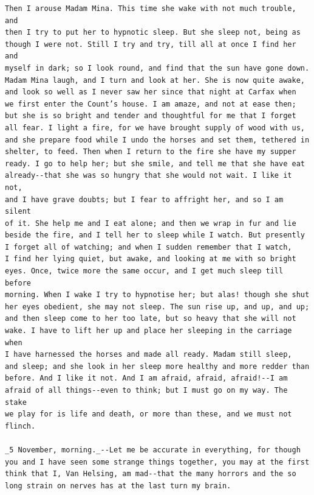 \documentclass{article}
\begin{document}
\begin{verbatim}
Then I arouse Madam Mina. This time she wake with not much trouble, and
then I try to put her to hypnotic sleep. But she sleep not, being as
though I were not. Still I try and try, till all at once I find her and
myself in dark; so I look round, and find that the sun have gone down.
Madam Mina laugh, and I turn and look at her. She is now quite awake,
and look so well as I never saw her since that night at Carfax when
we first enter the Count’s house. I am amaze, and not at ease then;
but she is so bright and tender and thoughtful for me that I forget
all fear. I light a fire, for we have brought supply of wood with us,
and she prepare food while I undo the horses and set them, tethered in
shelter, to feed. Then when I return to the fire she have my supper
ready. I go to help her; but she smile, and tell me that she have eat
already--that she was so hungry that she would not wait. I like it not,
and I have grave doubts; but I fear to affright her, and so I am silent
of it. She help me and I eat alone; and then we wrap in fur and lie
beside the fire, and I tell her to sleep while I watch. But presently
I forget all of watching; and when I sudden remember that I watch,
I find her lying quiet, but awake, and looking at me with so bright
eyes. Once, twice more the same occur, and I get much sleep till before
morning. When I wake I try to hypnotise her; but alas! though she shut
her eyes obedient, she may not sleep. The sun rise up, and up, and up;
and then sleep come to her too late, but so heavy that she will not
wake. I have to lift her up and place her sleeping in the carriage when
I have harnessed the horses and made all ready. Madam still sleep,
and sleep; and she look in her sleep more healthy and more redder than
before. And I like it not. And I am afraid, afraid, afraid!--I am
afraid of all things--even to think; but I must go on my way. The stake
we play for is life and death, or more than these, and we must not
flinch.

_5 November, morning._--Let me be accurate in everything, for though
you and I have seen some strange things together, you may at the first
think that I, Van Helsing, am mad--that the many horrors and the so
long strain on nerves has at the last turn my brain.


\end{verbatim}
\end{document}

